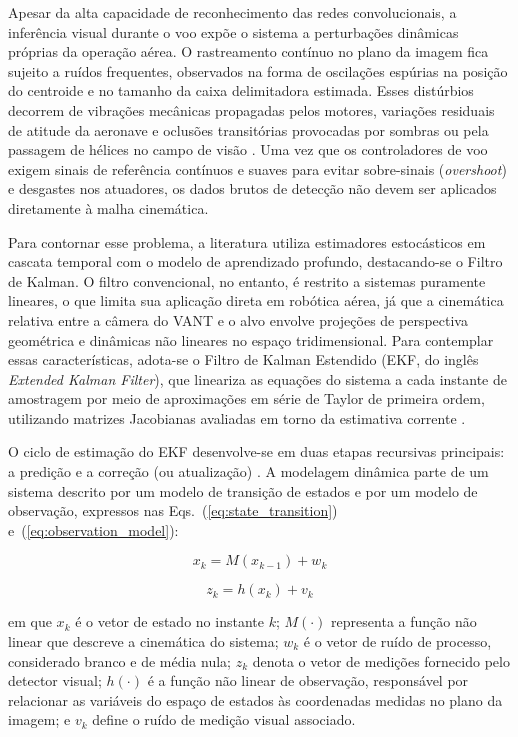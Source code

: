 Apesar da alta capacidade de reconhecimento das redes convolucionais, a inferência visual durante o voo expõe o sistema a perturbações dinâmicas próprias da operação aérea. O rastreamento contínuo no plano da imagem fica sujeito a ruídos frequentes, observados na forma de oscilações espúrias na posição do centroide e no tamanho da caixa delimitadora estimada. Esses distúrbios decorrem de vibrações mecânicas propagadas pelos motores, variações residuais de atitude da aeronave e oclusões transitórias provocadas por sombras ou pela passagem de hélices no campo de visão \cite{barisic2019}. Uma vez que os controladores de voo exigem sinais de referência contínuos e suaves para evitar sobre-sinais (\textit{overshoot}) e desgastes nos atuadores, os dados brutos de detecção não devem ser aplicados diretamente à malha cinemática.

Para contornar esse problema, a literatura utiliza estimadores estocásticos em cascata temporal com o modelo de aprendizado profundo, destacando-se o Filtro de Kalman. O filtro convencional, no entanto, é restrito a sistemas puramente lineares, o que limita sua aplicação direta em robótica aérea, já que a cinemática relativa entre a câmera do VANT e o alvo envolve projeções de perspectiva geométrica e dinâmicas não lineares no espaço tridimensional. Para contemplar essas características, adota-se o Filtro de Kalman Estendido (EKF, do inglês \textit{Extended Kalman Filter}), que lineariza as equações do sistema a cada instante de amostragem por meio de aproximações em série de Taylor de primeira ordem, utilizando matrizes Jacobianas avaliadas em torno da estimativa corrente \cite{tcc_mariahelena, kalman_beginners, kordic2010}.

O ciclo de estimação do EKF desenvolve-se em duas etapas recursivas principais: a predição e a correção (ou atualização) \cite{kalman_beginners, tcc_mariahelena}. A modelagem dinâmica parte de um sistema descrito por um modelo de transição de estados e por um modelo de observação, expressos nas Eqs.~(\ref{eq:state_transition}) e~(\ref{eq:observation_model}):

\begin{equation}
x_k = M(x_{k-1}) + w_k
\label{eq:state_transition}
\end{equation}

\begin{equation}
z_k = h(x_k) + v_k
\label{eq:observation_model}
\end{equation}

\noindent em que $x_k$ é o vetor de estado no instante $k$; $M(\cdot)$ representa a função não linear que descreve a cinemática do sistema; $w_k$ é o vetor de ruído de processo, considerado branco e de média nula; $z_k$ denota o vetor de medições fornecido pelo detector visual; $h(\cdot)$ é a função não linear de observação, responsável por relacionar as variáveis do espaço de estados às coordenadas medidas no plano da imagem; e $v_k$ define o ruído de medição visual associado.

